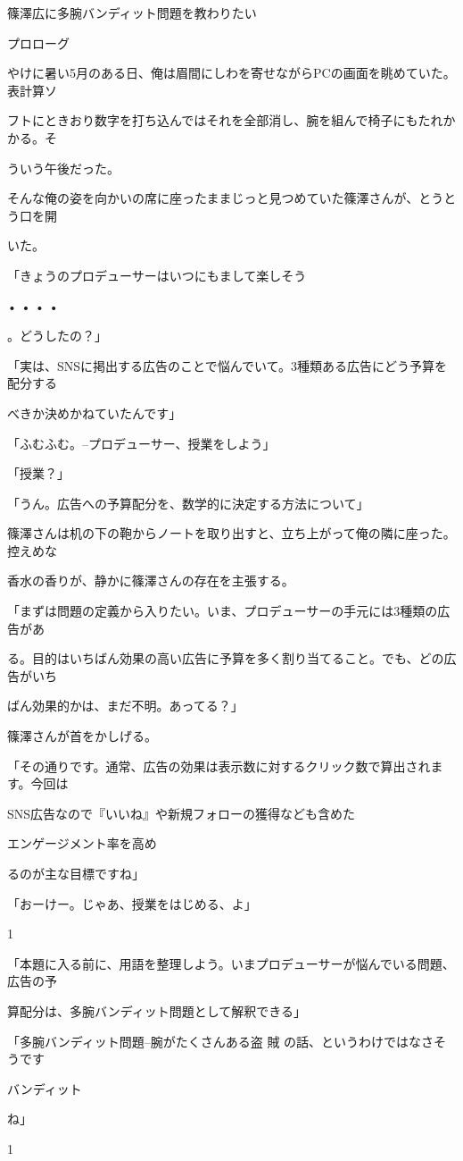 篠澤広に多腕バンディット問題を教わりたい\par
プロローグ\par
やけに暑い5⽉のある⽇、俺は眉間にしわを寄せながらPCの画⾯を眺めていた。表計算ソ\par
フトにときおり数字を打ち込んではそれを全部消し、腕を組んで椅⼦にもたれかかる。そ\par
ういう午後だった。\par
そんな俺の姿を向かいの席に座ったままじっと⾒つめていた篠澤さんが、とうとう⼝を開\par
いた。\par
「きょうのプロデューサーはいつにもまして楽しそう\par
• • • •\par
。どうしたの？」\par
「実は、SNSに掲出する広告のことで悩んでいて。3種類ある広告にどう予算を配分する\par
べきか決めかねていたんです」\par
「ふむふむ。--プロデューサー、授業をしよう」\par
「授業？」\par
「うん。広告への予算配分を、数学的に決定する⽅法について」\par
篠澤さんは机の下の鞄からノートを取り出すと、⽴ち上がって俺の隣に座った。控えめな\par
⾹⽔の⾹りが、静かに篠澤さんの存在を主張する。\par
「まずは問題の定義から⼊りたい。いま、プロデューサーの⼿元には3種類の広告があ\par
る。⽬的はいちばん効果の⾼い広告に予算を多く割り当てること。でも、どの広告がいち\par
ばん効果的かは、まだ不明。あってる？」\par
篠澤さんが⾸をかしげる。\par
「その通りです。通常、広告の効果は表⽰数に対するクリック数で算出されます。今回は\par
SNS広告なので『いいね』や新規フォローの獲得なども含めた\par
エンゲージメント率を⾼め\par
るのが主な⽬標ですね」\par
「おーけー。じゃあ、授業をはじめる、よ」\par
1\par
「本題に⼊る前に、⽤語を整理しよう。いまプロデューサーが悩んでいる問題、広告の予\par
算配分は、多腕バンディット問題として解釈できる」\par
「多腕バンディット問題--腕がたくさんある盗 賊 の話、というわけではなさそうです\par
バンディット\par
ね」\par
1\par

